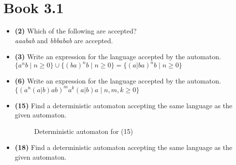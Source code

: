 \documentclass[defaultpackages]{simplereport}
\begin{document}
 \section*{Book 3.1}
 \begin{itemize}[label=]
 \item \textbf{(2)} Which of the following are accepted?\\
   \textit{aaabab} and \textit{bbbabab} are accepted.
 \item \textbf{(3)} Write an expression for the language accepted by the
   automaton.\\
   $\{a^nb\mid n \geq 0 \} \cup \{(ba)^nb \mid n \geq 0\} = \{(a \vert ba)^nb
     \mid n \geq 0\}$
 \item \textbf{(6)} Write an expression for the language accepted by the
   automaton.\\
   $\{(a^n(a \vert b) ab)^ma^k(a \vert b)a \mid n, m, k \geq 0\}$
 \item \textbf{(15)} Find a deterministic automaton accepting the same language
   as the given automaton.\\
   \begin{figure}[H]
     \centering
     \caption{Deterministic automaton for (15)}
  \end{figure}
 \item \textbf{(18)} Find a deterministic automaton accepting the same language
   as the given automaton.\\
   \begin{figure}[H]
     \centering
\end{figure}
\end{itemize}
\end{document}
